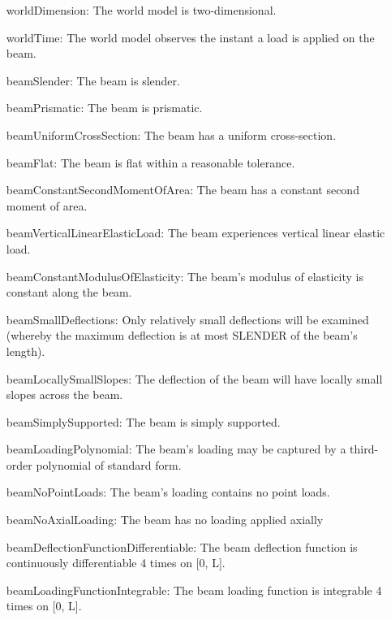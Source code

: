 \documentclass[12pt]{article}
\begin{document}
\begin{itemize}
\item[worldDimension:\phantomsection\label{worldDimension}]{The world model is two-dimensional.}
\item[worldTime:\phantomsection\label{worldTime}]{The world model observes the instant a load is applied on the beam.}
\item[beamSlender:\phantomsection\label{beamSlender}]{The beam is slender.}
\item[beamPrismatic:\phantomsection\label{beamPrismatic}]{The beam is prismatic.}
\item[beamUniformCrossSection:\phantomsection\label{beamUniformCrossSection}]{The beam has a uniform cross-section.}
\item[beamFlat:\phantomsection\label{beamFlat}]{The beam is flat within a reasonable tolerance.}
\item[beamConstantSecondMomentOfArea:\phantomsection\label{beamConstantSecondMomentOfArea}]{The beam has a constant second moment of area.}
\item[beamVerticalLinearElasticLoad:\phantomsection\label{beamVerticalLinearElasticLoad}]{The beam experiences vertical linear elastic load.}
\item[beamConstantModulusOfElasticity:\phantomsection\label{beamConstantModulusOfElasticity}]{The beam's modulus of elasticity is constant along the beam.}
\item[beamSmallDeflections:\phantomsection\label{beamSmallDeflections}]{Only relatively small deflections will be examined (whereby the maximum deflection is at most SLENDER of the beam's length).}
\item[beamLocallySmallSlopes:\phantomsection\label{beamLocallySmallSlopes}]{The deflection of the beam will have locally small slopes across the beam.}
\item[beamSimplySupported:\phantomsection\label{beamSimplySupported}]{The beam is simply supported.}
\item[beamLoadingPolynomial:\phantomsection\label{beamLoadingPolynomial}]{The beam's loading may be captured by a third-order polynomial of standard form.}
\item[beamNoPointLoads:\phantomsection\label{beamNoPointLoads}]{The beam's loading contains no point loads.}
\item[beamNoAxialLoading:\phantomsection\label{beamNoAxialLoading}]{The beam has no loading applied axially}
\item[beamDeflectionFunctionDifferentiable:\phantomsection\label{beamDeflectionFunctionDifferentiable}]{The beam deflection function is continuously differentiable 4 times on [0, L].}
\item[beamLoadingFunctionIntegrable:\phantomsection\label{beamLoadingFunctionIntegrable}]{The beam loading function is integrable 4 times on [0, L].}
\end{itemize}
\end{document}
